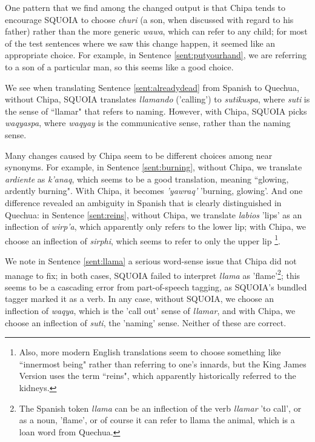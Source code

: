 One pattern that we find among the changed output is that Chipa tends to
encourage SQUOIA to choose \emph{churi} (a son, when discussed with regard to
his father) rather than the more generic \emph{wawa}, which can refer to any
child; for most of the test sentences where we saw this change happen, it
seemed like an appropriate choice. For example, in Sentence
\ref{sent:putyourhand}, we are referring to a son of a particular man, so this
seems like a good choice.

We see when translating Sentence \ref{sent:alreadydead}  from Spanish to
Quechua, without Chipa, SQUOIA translates \emph{llamando} ('calling') to
\emph{sutikuspa}, where \emph{suti} is the sense of ``llamar" that refers to
naming. However, with Chipa, SQUOIA picks \emph{waqyaspa}, where \emph{waqyay}
is the communicative sense, rather than the naming sense.

Many changes caused by Chipa seem to be different choices among near synonyms.
For example, in Sentence \ref{sent:burning}, without Chipa, we translate
\emph{ardiente} as \emph{k'anaq}, which seems to be a good translation, meaning
``glowing, ardently burning". With Chipa, it becomes \emph{'yawraq'} 'burning,
glowing'. And one difference revealed an ambiguity in Spanish that is clearly
distinguished in Quechua: in Sentence \ref{sent:reins}, without Chipa, we
translate \emph{labios} 'lips' as an inflection of \emph{wirp'a}, which
apparently only refers to the lower lip; with Chipa, we choose an inflection of
\emph{sirphi}, which seems to refer to only the upper lip
\footnote{Also, more modern English translations seem to choose something like
``innermost being" rather than referring to one's innards, but the King James
Version uses the term ``reins", which apparently historically referred to the
kidneys.}.

We note in Sentence \ref{sent:llama} a serious word-sense issue that Chipa did
not manage to fix; in both cases, SQUOIA failed to interpret \emph{llama} as
'flame'\footnote{The Spanish token \emph{llama} can be an inflection of the
verb \emph{llamar} 'to call', or as a noun, 'flame', or of course it can refer
to llama the animal, which is a loan word from Quechua.}; this seems to be a
cascading error from part-of-speech tagging, as SQUOIA's bundled tagger marked
it as a verb. In any case, without SQUOIA, we choose an inflection of
\emph{waqya}, which is the 'call out' sense of \emph{llamar}, and with Chipa,
we choose an inflection of \emph{suti}, the 'naming' sense. Neither of these
are correct.


